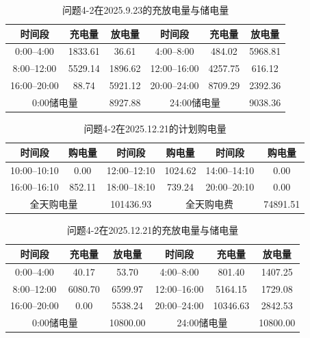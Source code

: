 \documentclass[UTF8]{ctexart}
\begin{document}
    \begin{table}[htbp]
        \centering
        \caption{问题4-2在2025.9.23的充放电量与储电量}
        \label{tab:q42_battery_0923}
        \begin{tabular}{cccccc}
            \toprule
            时间段 & 充电量 & 放电量 & 时间段 & 充电量 & 放电量 \\
            \midrule
            0:00--4:00 & 1833.61 & 36.61 & 4:00--8:00 & 484.02 & 5968.81 \\
            8:00--12:00 & 5529.14 & 1896.62 & 12:00--16:00 & 4257.75 & 616.12 \\
            16:00--20:00 & 88.74 & 5921.12 & 20:00--24:00 & 8709.29 & 2392.36 \\
            \midrule
            \multicolumn{2}{c}{0:00储电量} & 8927.88 &
            \multicolumn{2}{c}{24:00储电量} & 9038.36 \\
            \bottomrule
        \end{tabular}
    \end{table}
    
    \begin{table}[htbp]
        \centering
        \caption{问题4-2在2025.12.21的计划购电量}
        \label{tab:q42_tenminute_1221}
        \begin{tabular}{cccccc}
            \toprule
            时间段 & 购电量 & 时间段 & 购电量 & 时间段 & 购电量 \\
            \midrule
            10:00--10:10 & 0.00 & 12:00--12:10 & 1024.62 & 14:00--14:10 & 0.00 \\
            16:00--16:10 & 852.11 & 18:00--18:10 & 739.24 & 20:00--20:10 & 0.00 \\
            \midrule
            \multicolumn{2}{c}{全天购电量} & 101436.93 &
            \multicolumn{2}{c}{全天购电费} & 74891.51 \\
            \bottomrule
        \end{tabular}
    \end{table}
    
    \begin{table}[htbp]
        \centering
        \caption{问题4-2在2025.12.21的充放电量与储电量}
        \label{tab:q42_battery_1221}
        \begin{tabular}{cccccc}
            \toprule
            时间段 & 充电量 & 放电量 & 时间段 & 充电量 & 放电量 \\
            \midrule
            0:00--4:00 & 40.17 & 53.70 & 4:00--8:00 & 801.40 & 1407.25 \\
            8:00--12:00 & 6080.70 & 6599.97 & 12:00--16:00 & 5164.15 & 1729.08 \\
            16:00--20:00 & 0.00 & 5538.24 & 20:00--24:00 & 10346.63 & 2842.53 \\
            \midrule
            \multicolumn{2}{c}{0:00储电量} & 10800.00 &
            \multicolumn{2}{c}{24:00储电量} & 10800.00 \\
            \bottomrule
        \end{tabular}
    \end{table}
    
\end{document}
